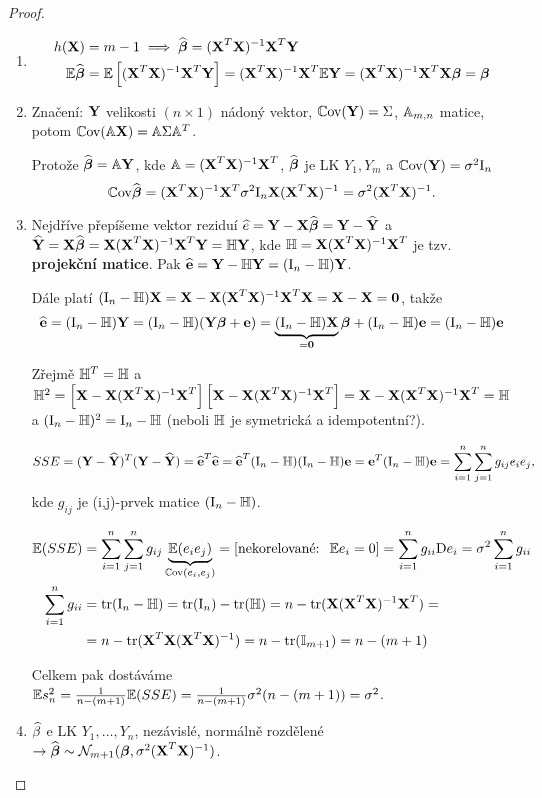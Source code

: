 \begin{proof}
\begin{enumerate}
\item 
\begin{align*}
	h(\X) & = m - 1 \implies \wbetab = (\X^T \X)^{-1} \X^T \Y \\
	\E \wbetab & = \E \left[ (\X^T \X)^{-1} \X^T \Y \right] = (\X^T \X)^{-1} \X^T \E\Y = (\X^T \X)^{-1} \X^T \X \betab = \betab
\end{align*}

\item 
Značení: $\Y$ velikosti $(n \times 1)$ nádoný vektor, $\Cov(\Y) = \Sigma$, $\Am_{m, n}$ matice, potom $\Cov(\Am \X) = \Am \Sigma \Am^T$.

Protože $\wbetab = \Am \Y$, kde $\Am = (\X^T \X)^{-1} \X^T$, $\wbetab$ je LK $Y_1, Y_m$ a $\Cov(\Y) = \sigma^2 \In$
$$
	\Cov \wbetab = (\X^T \X)^{-1} \X^T \sigma^2 \In \X (\X^T \X)^{-1} = \sigma^2 (\X^T \X)^{-1}.
$$

\item
Nejdříve přepíšeme vektor reziduí $\he = \Y - \X \wbetab = \Y - \hYb$ a \\
$\hYb = \X \wbetab = \X (\X^T \X)^{-1} \X^T \Y = \Hm \Y$, kde $\Hm = \X (\X^T \X)^{-1} \X^T$ je tzv. \textbf{projekční matice}. Pak $\heb = \Y - \Hm \Y = (\In - \Hm) \Y$.

Dále platí $(\In - \Hm) \X = \X - \X (\X^T \X)^{-1} \X^T \X = \X - \X = \boldsymbol{0}$, takže
$$
	\heb = (\In - \Hm) \Y = (\In - \Hm)(\Y \betab + \eb) = \underbrace{(\In - \Hm) \X}_{ = \boldsymbol{0}} \betab + (\In - \Hm) \eb = (\In - \Hm) \eb
$$

Zřejmě $\Hm^T = \Hm$ a $\Hm^2 = \left[ \X - \X (\X^T \X)^{-1} \X^T \right] \left[ \X - \X (\X^T \X)^{-1} \X^T \right] = \X - \X (\X^T \X)^{-1} \X^T = \Hm$ a $(\In - \Hm)^2 = \In - \Hm$ (neboli $\Hm$ je symetrická a idempotentní?).

$$
	SSE = (\Y - \hYb)^T(\Y - \hYb) = \heb^T \heb = \heb^T (\In - \Hm)(\In - \Hm) \eb = \eb^T (\In - \Hm) \eb = \sumin \sumjn g_{ij} e_i e_j,
$$
kde $g_{ij}$ je (i,j)-prvek matice $(\In - \Hm)$.

\begin{align*}
	\E(SSE) & = \sumin \sumjn g_{ij} \underbrace{\E( e_i e_j)}_{\Cov(e_i, e_j)} = \left[ \text{nekorelované: \;} \E e_i = 0 \right] = \sumin g_{ii} \D e_i = \sigma^2 \sumin g_{ii} \\
	\sumin g_{ii} & = \trace(\In - \Hm) = \trace(\In) - \trace(\Hm) = n - \trace(\X (\X^T \X)^{-1} \X^T) = \\
	& = n - \trace(\X^T \X (\X^T \X)^{-1} ) = n - \trace(\Identita{m+1}) = n - (m + 1)
\end{align*}

Celkem pak dostáváme $\E s_n^2 = \frac{1}{n - (m + 1)} \E (SSE) = \frac{1}{n - (m + 1)} \sigma^2(n - (m + 1)) = \sigma^2$.

\item 
$\wbeta$ e LK $Y_1, \dots, Y_n$, nezávislé, normálně rozdělené $\rightarrow \wbetab \sim \NN_{m+1} (\betab, \sigma^2(\X^T \X)^{-1})$.
\end{enumerate}
\end{proof}

